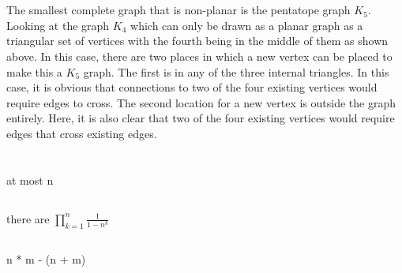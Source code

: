 \documentclass[a4paper]{article}
\begin{document}
\section{}
The smallest complete graph that is non-planar is the pentatope graph $K_5$. Looking at the graph $K_4$ which can only be drawn as a planar graph as a triangular set of vertices with the fourth being in the middle of them as shown above. In this case, there are two places in which a new vertex can be placed to make this a $K_5$ graph. The first is in any of the three internal triangles. In this case, it is obvious that connections to two of the four existing vertices would require edges to cross. The second location for a new vertex is outside the graph entirely. Here, it is also clear that two of the four existing vertices would require edges that cross existing edges. 

\section{}
\subsection{}
at most n
\subsection{}
there are $\prod_{k=1}^{n}{\frac{1}{1 - n^k}}$
\subsection{}
n * m - (n + m)
\end{document}

